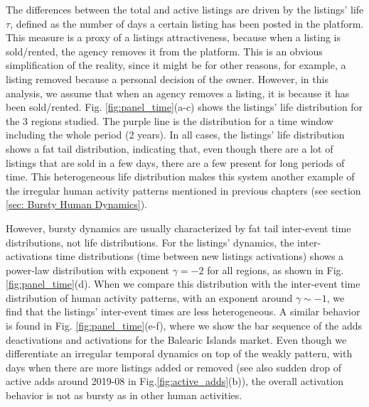 The differences between the total and active listings are driven by the listings' life $\tau$, defined as the number of days a certain listing has been posted in the platform. This measure is a proxy of a listings attractiveness, because when a listing is sold/rented, the agency removes it from the platform. This is an obvious simplification of the reality, since it might be for other reasons, for example, a listing removed because a personal decision of the owner. However, in this analysis, we assume that when an agency removes a listing, it is because it has been sold/rented. Fig. \ref{fig:panel_time}(a-c) shows the listings' life distribution for the 3 regions studied. The purple line is the distribution for a time window including the whole period (2 years). In all cases, the listings' life distribution shows a fat tail distribution, indicating that, even though there are a lot of listings that are sold in a few days, there are a few present for long periods of time. This heterogeneous life distribution makes this system another example of the irregular human activity patterns mentioned in previous chapters (see section \ref{sec: Bursty Human Dynamics}).

However, bursty dynamics are usually characterized by fat tail inter-event time distributions, not life distributions. For the listings' dynamics, the inter-activations time distributions (time between new listings activations) shows a power-law distribution with exponent $\gamma = -2$ for all regions, as shown in Fig. \ref{fig:panel_time}(d). When we compare this distribution with the inter-event time distribution of human activity patterns, with an exponent around $\gamma \sim -1$, we find that the listings' inter-event times are less heterogeneous. A similar behavior is found in Fig. \ref{fig:panel_time}(e-f), where we show the bar sequence of the adds deactivations and activations for the Balearic Islands market. Even though we differentiate an irregular temporal dynamics on top of the weakly pattern, with days when there are more listings added or removed (see also sudden drop of active adds around 2019-08 in Fig.\ref{fig:active_adds}(b)), the overall activation behavior is not as bursty as in other human activities.

